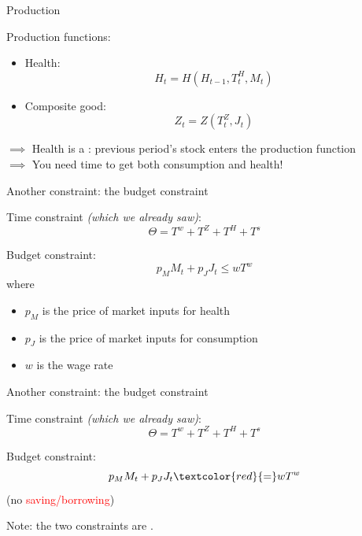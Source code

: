 \begin{frame}{Production}

    Production functions:
    \begin{itemize}
        \item Health:
        \begin{equation*}
            H_t = H\left(H_{t-1}, T_t^H, M_t \right)
        \end{equation*}

        \item Composite good:
        \begin{equation*}
            Z_t = Z\left( T_t^Z, J_t \right)
        \end{equation*}
    \end{itemize}
    \vspace{5mm}
    $\implies$ Health is a : previous period's stock enters the production function\\
    $\implies$ You need time to get both consumption and health!
\end{frame}
\begin{frame}{Another constraint: the budget constraint}

    Time constraint \textit{(which we already saw)}:
    \begin{equation*}
        \Theta = T^w + T^Z + T^H + T^s
    \end{equation*}
    \pause

    Budget constraint:
    \begin{equation*}
        p_M M_t + p_J J_t \leq w T^w
    \end{equation*}
    where
    \begin{itemize}
        \item $p_M$ is the price of market inputs for health
        \item $p_J$ is the price of market inputs for consumption
        \item $w$ is the wage rate
    \end{itemize}

\end{frame}
\begin{frame}{Another constraint: the budget constraint}

    Time constraint \textit{(which we already saw)}:
    \begin{equation*}
        \Theta = T^w + T^Z + T^H + T^s
    \end{equation*}

    Budget constraint:
    \begin{equation*}
        p_M M_t + p_J J_t \textcolor{red}{=} w T^w
    \end{equation*}
    (no \textcolor{red}{saving/borrowing})\\

    \vspace{3mm}

    Note: the two constraints are .

\end{frame}
